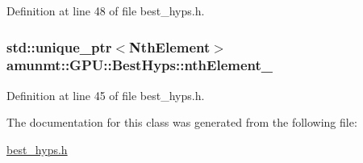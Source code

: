 Definition at line 48 of file best\+\_\+hyps.\+h.

\subsubsection[{\texorpdfstring{nth\+Element\+\_\+}{nthElement_}}]{\setlength{\rightskip}{0pt plus 5cm}std\+::unique\+\_\+ptr$<${\bf Nth\+Element}$>$ amunmt\+::\+G\+P\+U\+::\+Best\+Hyps\+::nth\+Element\+\_\+\hspace{0.3cm}{\ttfamily [private]}}\hypertarget{classamunmt_1_1GPU_1_1BestHyps_a995703d0b8ddcbf445d59c6b20b794b7}{}\label{classamunmt_1_1GPU_1_1BestHyps_a995703d0b8ddcbf445d59c6b20b794b7}


Definition at line 45 of file best\+\_\+hyps.\+h.



The documentation for this class was generated from the following file\+:\begin{DoxyCompactItemize}
\item 
\hyperlink{best__hyps_8h}{best\+\_\+hyps.\+h}\end{DoxyCompactItemize}
